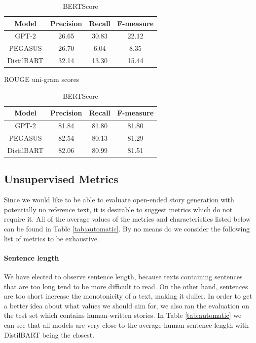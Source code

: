 \documentclass[11pt,a4paper]{article}
\begin{document}
\begin{table}[] %
    \centering
    \begin{tabular}{|c|c|c|c|} %
    \hline %
    \textbf{Model}   & \textbf{Precision} & \textbf{Recall} & \textbf{F-measure}  \\\hline
      GPT-2   & 26.65 & 30.83 & 22.12 \\
      PEGASUS & 26.70 & 6.04 & 8.35 \\
      DistilBART & 32.14 & 13.30 & 15.44 \\
    \hline
    \end{tabular}
    \caption{ROUGE uni-gram scores}
    \label{tab:rouge}
    \begin{tabular}{|c|c|c|c|} %
    \hline %
    \textbf{Model}   & \textbf{Precision} & \textbf{Recall} & \textbf{F-measure}  \\\hline
      GPT-2   & 81.84 & 81.80 & 81.80 \\
      PEGASUS & 82.54 & 80.13 & 81.29 \\
      DistilBART & 82.06 & 80.99 & 81.51 \\
    \hline
    \end{tabular}
    \caption{BERTScore}
    \label{tab:bertscore}
\end{table}


\subsection{Unsupervised Metrics}
Since we would like to be able to evaluate open-ended story generation with potentially no reference text, it is desirable to suggest metrics which do not require it.
All of the average values of the metrics and characteristics listed below can be found in Table \ref{tab:automatic}. By no means do we consider the following list of metrics to be exhaustive.

\paragraph{Sentence length}
We have elected to observe sentence length, because texts containing sentences that are too long tend to be more difficult to read. On the other hand, sentences are too short increase the monotonicity of a text, making it duller. In order to get a better idea about what values we should aim for, we also ran the evaluation on the test set which contains human-written stories. In Table \ref{tab:automatic} we can see that all models are very close to the average human sentence length with DistilBART being the closest.
\end{document}
